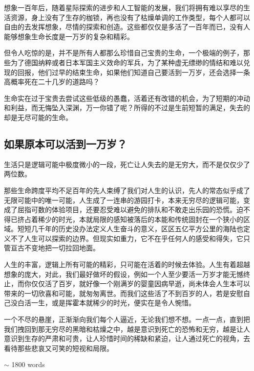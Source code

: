 想象一百年后，随着星际探索的进步和人工智能的发展，我们将拥有难以享尽的生活资源，身上没有了生存的枷锁，再也没有了枯燥单调的工作类型，每个人都可以自由的去发挥想象，尽情的探索和创造。这些都仅仅是多活了一百年而已，没有人能够想象生命长度是一万岁的复杂和精彩。

但令人吃惊的是，并不是所有人都那么珍惜自己宝贵的生命，一个极端的例子，那些为了德国纳粹或者日本军国主义效命的军兵，为了某种虚无缥缈的情结和难以兑现的回报，他们过早的结束生命，如果他们知道自己要活到一万岁，还会选择一条高概率死在二十几岁的道路吗？

生命实在过于宝贵去尝试这些低级的愚蠢，活着还有改错的机会，为了短期的冲动和利益，而无悔坠入深渊，万一你错了呢？所得的不过是生前短暂的满足，失去的却是无尽可能的生命。

\subsection{如果原本可以活到一万岁？}

生活只是逻辑可能中极度微小的一段，死亡让人失去的是无穷大，而不是仅仅少了两位数。

那些生命跨度平均不足百年的先人束缚了我们对人生的认识，先人的常态似乎成了无限可能中的唯一可能，人生成了一连串的游园打卡，本来无穷尽的逻辑可能，变成了屈指可数的体验项目，还要忍受难以避免的排队和不敢走出乐园的恐慌。迫不得已挤占着稀少的时光，本就局限的感知被落后的本能和传统固封在一个狭小的区域。短短几千年的历史没办法定义人生奋斗的意义，区区五亿平方公里的海陆也定义不了人生可以探索的边界。但现实如重力，它不在乎任何人的感受和得失，它只管亘古不变地把一切拉回地面。

人生的丰富，逻辑上所有可能的精彩，只可能在活着的时候去体验。人生有着超越想象的庞大，对此，我们最好做坏的假设，例如一个人至少要活一万岁才能无憾终止，而你仅仅活了百岁，就好像一个刚满岁的婴童因病早逝，尚未体会人生本可以带来的一切欣喜和可能，就匆匆离世。而我们这些活了不到百岁的人，若是安慰自己没白活一生，或是挥霍本就稀少的时光，便实在是令人惋惜。

一个不尽的悬崖，正渐渐向我们每个人逼近，无论我们想不想。一点一点，直到把我们拽回到那无穷尽的黑暗和枯燥之中，越是意识到死亡的恐怖和无穷，越是让人意识到生存的严肃和可贵，让人珍惜时间的稀缺和紧迫，让人通过死亡的视角，去看待那些悲哀又可笑的短视和局限。

$\sim$ 1800 words
